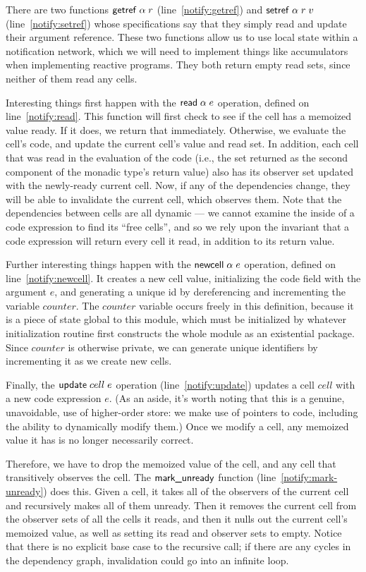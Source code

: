 \documentclass[natbib]{sigplanconf}
\begin{document}
There are two functions $\mbox{\textsf{{getref}}}\; \alpha\;r$ (line~\ref{notify:getref})
and $\mbox{\textsf{{setref}}}\; \alpha\;r\;v$ (line~\ref{notify:setref}) whose
specifications say that they simply read and update their argument
reference. These two functions allow us to use local state within a
notification network, which we will need to implement things like
accumulators when implementing reactive programs. They both return
empty read sets, since neither of them read any cells.

Interesting things first happen with the $\mbox{\textsf{{read}}}\; \alpha\;e$ operation,
defined on line~\ref{notify:read}. This function will first check
to see if the cell has a memoized value ready. If it does, we return
that immediately. Otherwise, we evaluate the cell's code, and update
the current cell's value and read set. In addition, each cell that was
read in the evaluation of the code (i.e., the set returned as the
second component of the monadic type's return value) also has its
observer set updated with the newly-ready current cell. Now, if any of
the dependencies change, they will be able to invalidate the current
cell, which observes them. Note that the dependencies between cells
are all dynamic --- we cannot examine the inside of a code expression
to find its ``free cells'', and so we rely upon the invariant that a
code expression will return every cell it read, in addition to its
return value.

Further interesting things happen with the $\mbox{\textsf{{newcell}}}\; \alpha\; e$
operation, defined on line~\ref{notify:newcell}.  It creates a new
cell value, initializing the code field with the argument $e$, and
generating a unique id by dereferencing and incrementing the variable
$counter$. The $counter$ variable occurs freely in this definition,
because it is a piece of state global to this module, which must be
initialized by whatever initialization routine first constructs the
whole module as an existential package.  Since $counter$ is otherwise
private, we can generate unique identifiers by incrementing it as we
create new cells.

Finally, the $\mbox{\textsf{{update}}}\;cell\;e$ operation (line~\ref{notify:update}) updates a cell
$cell$ with a new code expression $e$. (As an aside, it's worth
noting that this is a genuine, unavoidable, use of higher-order store:
we make use of pointers to code, including the ability to dynamically
modify them.) Once we modify a cell, any memoized value it has is no
longer necessarily correct.

Therefore, we have to drop the memoized value of the cell, and any
cell that transitively observes the cell. The $\mbox{\textsf{{mark\_unready}}}$
function (line~\ref{notify:mark-unready}) does this. Given a cell, it
takes all of the observers of the current cell and recursively makes
all of them unready. Then it removes the current cell from the
observer sets of all the cells it reads, and then it nulls out the
current cell's memoized value, as well as setting its read and
observer sets to empty. Notice that there is no explicit base case to
the recursive call; if there are any cycles in the dependency graph,
invalidation could go into an infinite loop.
\end{document}
